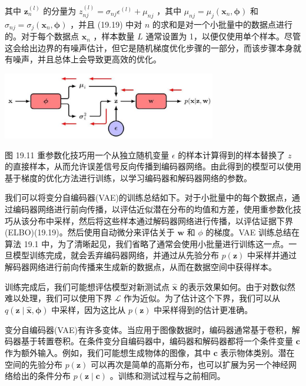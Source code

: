 \documentclass[10pt]{article}
\begin{document}
其中 \({\mathbf{z}}_{n}^{\left( l\right) }\) 的分量为 \({z}_{nj}^{\left( l\right) } = {\sigma }_{nj}{\epsilon }^{\left( l\right) } + {\mu }_{nj}\) ，其中 \({\mu }_{nj} = {\mu }_{j}\left( {{\mathbf{x}}_{n},\mathbf{\phi }}\right)\) 和 \({\sigma }_{nj} = {\sigma }_{j}\left( {{\mathbf{x}}_{n},\mathbf{\phi }}\right)\) ，并且 (19.19) 中对 \(n\) 的求和是对一个小批量中的数据点进行的。对于每个数据点 \({\mathbf{x}}_{n}\) ，样本数量 \(L\) 通常设置为 1，以便仅使用单个样本。尽管这会给出边界的有噪声估计，但它是随机梯度优化步骤的一部分，而该步骤本身就有噪声，并且总体上会导致更高效的优化。

\begin{center}
\includegraphics[max width=0.7\textwidth]{images/0194e279-9b28-703a-88f4-c3ac21e2010d_595_595_337_874_273_0.jpg}
\end{center}
\hspace*{3em} 

图 19.11 重参数化技巧用一个从独立随机变量 \(\epsilon\) 的样本计算得到的样本替换了 \(z\) 的直接样本，从而允许误差信号反向传播到编码器网络。由此得到的模型可以使用基于梯度的优化方法进行训练，以学习编码器和解码器网络的参数。

我们可以将变分自编码器(VAE)的训练总结如下。对于小批量中的每个数据点，通过编码器网络进行前向传播，以评估近似潜在分布的均值和方差，使用重参数化技巧从该分布中采样，然后将这些样本通过解码器网络进行传播，以评估证据下界(ELBO)(19.19)。然后使用自动微分来评估关于 \(\mathbf{w}\) 和 \(\phi\) 的梯度。VAE 训练总结在算法 19.1 中，为了清晰起见，我们省略了通常会使用小批量进行训练这一点。一旦模型训练完成，就会丢弃编码器网络，并通过从先验分布 \(p\left( \mathbf{z}\right)\) 中采样并通过解码器网络进行前向传播来生成新的数据点，从而在数据空间中获得样本。

训练完成后，我们可能想评估模型对新测试点 \(\widehat{\mathbf{x}}\) 的表示效果如何。由于对数似然难以处理，我们可以使用下界 \(\mathcal{L}\) 作为近似。为了估计这个下界，我们可以从 \(q\left( {\mathbf{z} \mid  \widehat{\mathbf{x}},\mathbf{\phi }}\right)\) 中采样，因为这比从 \(p\left( \mathbf{z}\right)\) 中采样得到的估计更准确。

变分自编码器(VAE)有许多变体。当应用于图像数据时，编码器通常基于卷积，解码器基于转置卷积。在条件变分自编码器中，编码器和解码器都将一个条件变量 \(\mathbf{c}\) 作为额外输入。例如，我们可能想生成物体的图像，其中 \(\mathbf{c}\) 表示物体类别。潜在空间的先验分布 \(p\left( \mathbf{z}\right)\) 可以再次是简单的高斯分布，也可以扩展为另一个神经网络给出的条件分布 \(p\left( {\mathbf{z} \mid  \mathbf{c}}\right)\) 。训练和测试过程与之前相同。
\end{document}
